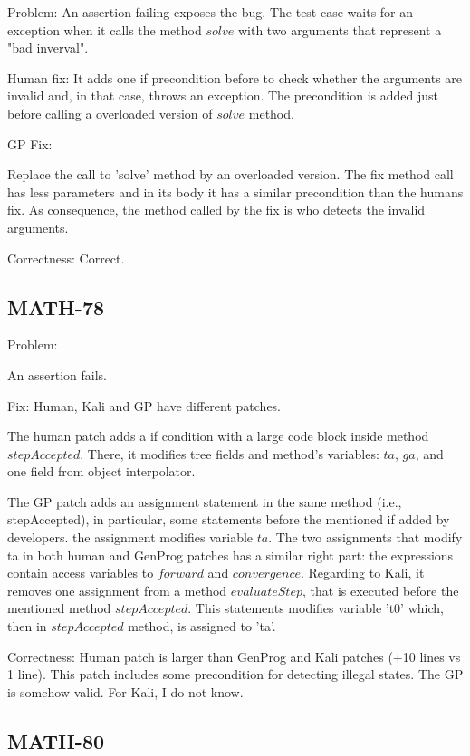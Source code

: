 \documentclass{article}
\begin{document}
Problem: 
An assertion failing exposes the bug. 
The test case waits for an exception when it calls the method $solve$ with two arguments that represent a "bad inverval".

Human fix:
It adds one if precondition before to check whether the arguments are invalid and, in that case, throws an exception.  
The precondition is added just before calling a overloaded version of $solve$ method.

GP Fix:

Replace the call to 'solve' method by an overloaded version.
The fix method call has less parameters and in its body it has  a similar precondition than the humans fix.
As consequence, the method called by the fix is who detects the invalid arguments.


Correctness: Correct.

\subsection{MATH-78}

Problem:

An assertion fails.


Fix:
Human, Kali and GP have different patches.

The human patch adds a if condition with a large code block inside method $stepAccepted$.
There, it modifies tree fields and method's variables: $ta$, $ga$, and one field from object interpolator.

The GP patch adds an assignment statement in the same method (i.e., stepAccepted), in particular, some statements before the mentioned if added by developers.
the assignment modifies variable $ta$.
The two assignments that modify ta in both human and GenProg patches has a similar right part: the expressions contain access variables to $forward$ and $convergence$.
Regarding to Kali, it removes one assignment from a method $evaluateStep$, that is executed before the mentioned method $stepAccepted$. 
This statements modifies variable 't0' which, then in  $stepAccepted$ method, is assigned to 'ta'.


Correctness: 
Human patch is larger than GenProg and Kali patches (+10 lines vs 1 line).
This patch includes some precondition for detecting illegal states.
The GP is somehow valid. For Kali, I do not know.


\subsection{MATH-80}
\end{document}

